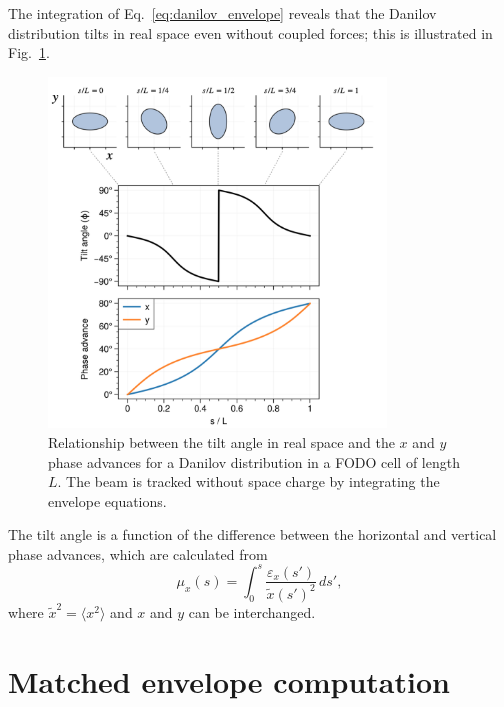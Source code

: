 The integration of Eq.~\eqref{eq:danilov_envelope} reveals that the Danilov distribution tilts in real space even without coupled forces; this is illustrated in Fig.~\ref{fig:fodo_zerosc}. 
%
\begin{figure}[!p]
    \centering
    \includegraphics[width=0.8\textwidth]{Images/chapter2/fodo_zerosc.png}
    \caption{Relationship between the tilt angle in real space and the $x$ and $y$ phase advances for a Danilov distribution in a FODO cell of length $L$. The beam is tracked without space charge by integrating the envelope equations.}
    \label{fig:fodo_zerosc}
\end{figure}
%
The tilt angle is a function of the difference between the horizontal and vertical phase advances, which are calculated from
\begin{equation} \label{eq:phase_advance}
    \mu_x(s) = \int_{0}^{s}
    {\frac{\varepsilon_x(s')}{{\tilde{x}(s')}^2} \, ds'},
\end{equation}
where $\tilde{x}^2 = \langle{x^2}\rangle$ and $x$ and $y$ can be interchanged.



\section{Matched envelope computation}

